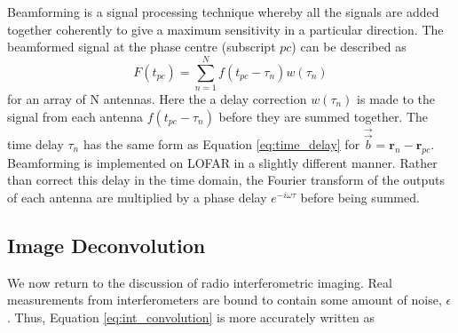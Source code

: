 Beamforming is a signal processing technique whereby all the signals are added together coherently to give a maximum sensitivity in a particular direction. The beamformed signal at the phase centre (subscript $pc$) can be described as \citep{Chen2021}
\begin{equation}
\label{eq_beamform}
F(t_{pc}) = \sum_{n=1}^N f(t_{pc} - \tau_n) w (\tau_n)
\end{equation}
for an array of N antennas. Here the a delay correction $w(\tau_n)$ is made to the signal from each antenna $f(t_{pc} - \tau_n)$ before they are summed together. The time delay $\tau_n$ has the same form as Equation \ref{eq:time_delay} for $\overrightarrow{\Vec{b}} = \mathbf{r}_n - \mathbf{r}_{pc}$. Beamforming is implemented on LOFAR in a slightly different manner. Rather than correct this delay in the time domain, the Fourier transform of the outputs of each antenna are multiplied by a phase delay $e^{- i \omega \tau}$ before being summed.

\subsection{Image Deconvolution}
\label{sec:imaging}
We now return to the discussion of radio interferometric imaging. Real measurements from interferometers are bound to contain some amount of noise, $\epsilon$. Thus, Equation \ref{eq:int_convolution} is more accurately written as
 
